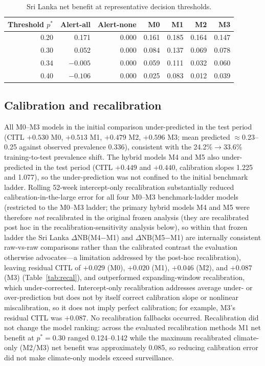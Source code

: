 \documentclass[11pt,a4paper]{article}
\begin{document}
\begin{table}[htbp]
\centering
\caption{Sri Lanka net benefit at representative decision thresholds.}
\label{tab:slthresh}
\small
\begin{tabular}{rrrrrrr}
\toprule
Threshold $p^*$ & Alert-all & Alert-none & M0 & M1 & M2 & M3 \\
\midrule
0.20 & 0.171 & 0.000 & 0.161 & 0.185 & 0.164 & 0.147 \\
0.30 & 0.052 & 0.000 & 0.084 & 0.137 & 0.069 & 0.078 \\
0.34 & $-0.005$ & 0.000 & 0.059 & 0.111 & 0.032 & 0.060 \\
0.40 & $-0.106$ & 0.000 & 0.025 & 0.083 & 0.012 & 0.039 \\
\bottomrule
\end{tabular}
\end{table}



\subsection{Calibration and recalibration}
All M0--M3 models in the initial comparison under-predicted in the test period (CITL $+0.530$ M0, $+0.513$ M1, $+0.479$ M2, $+0.596$ M3; mean predicted $\approx$0.23--0.25 against observed prevalence 0.336), consistent with the 24.2\%$\rightarrow$33.6\% training-to-test prevalence shift. The hybrid models M4 and M5 also under-predicted in the test period (CITL $+0.449$ and $+0.440$, calibration slopes 1.225 and 1.077), so the under-prediction was not confined to the initial benchmark ladder. Rolling 52-week intercept-only recalibration substantially reduced calibration-in-the-large error for all four M0--M3 benchmark-ladder models (restricted to the M0--M3 ladder; the primary hybrid models M4 and M5 were therefore \emph{not} recalibrated in the original frozen analysis (they are recalibrated post hoc in the recalibration-sensitivity analysis below), so within that frozen ladder the Sri Lanka $\Delta$NB(M4$-$M1) and $\Delta$NB(M5$-$M1) are internally consistent raw-vs-raw comparisons rather than the calibrated contrast the evaluation otherwise advocates---a limitation addressed by the post-hoc recalibration), leaving residual CITL of $+0.029$ (M0), $+0.020$ (M1), $+0.046$ (M2), and $+0.087$ (M3) (Table~\ref{tab:recal}), and outperformed expanding-window recalibration, which under-corrected. Intercept-only recalibration addresses average under- or over-prediction but does not by itself correct calibration slope or nonlinear miscalibration, so it does not imply perfect calibration; for example, M3's residual CITL was $+0.087$. No recalibration fallbacks occurred. Recalibration did not change the model ranking: across the evaluated recalibration methods M1 net benefit at $p^*=0.30$ ranged 0.124--0.142 while the maximum recalibrated climate-only (M2/M3) net benefit was approximately 0.085, so reducing calibration error did not make climate-only models exceed surveillance.
\end{document}
